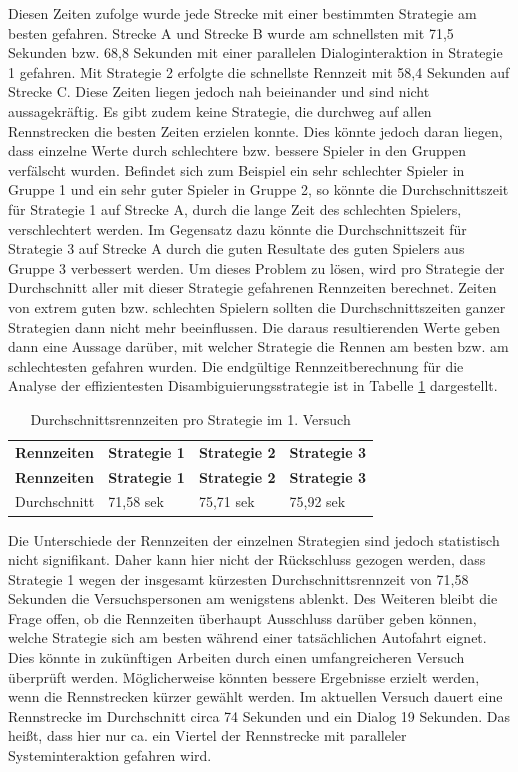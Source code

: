 \documentclass[12pt,a4paper]{scrartcl}
\begin{document}
Diesen Zeiten zufolge wurde jede Strecke mit einer bestimmten Strategie am besten gefahren. Strecke A  und Strecke B wurde am schnellsten mit 71,5 Sekunden bzw. 68,8 Sekunden mit einer parallelen Dialoginteraktion in Strategie 1 gefahren. Mit Strategie 2 erfolgte die schnellste Rennzeit mit 58,4 Sekunden auf Strecke C. Diese Zeiten liegen jedoch nah beieinander und sind nicht aussagekräftig. Es gibt zudem keine Strategie, die durchweg auf allen Rennstrecken die besten Zeiten erzielen konnte. Dies könnte jedoch daran liegen, dass einzelne Werte durch schlechtere bzw. bessere Spieler in den Gruppen verfälscht wurden.
Befindet sich zum Beispiel ein sehr schlechter Spieler in Gruppe 1 und ein sehr guter Spieler in Gruppe 2, so könnte die Durchschnittszeit für Strategie 1 auf Strecke A, durch die lange Zeit des schlechten Spielers, verschlechtert werden. Im Gegensatz dazu könnte die Durchschnittszeit für Strategie 3 auf Strecke A durch die guten Resultate des guten Spielers aus Gruppe 3 verbessert werden. Um dieses Problem zu lösen, wird pro Strategie der Durchschnitt aller mit dieser Strategie gefahrenen Rennzeiten berechnet. Zeiten von extrem guten bzw. schlechten Spielern sollten die Durchschnittszeiten ganzer Strategien dann nicht mehr beeinflussen. Die daraus resultierenden Werte geben dann eine Aussage darüber, mit welcher Strategie die Rennen am besten bzw. am schlechtesten gefahren wurden. 
Die endgültige Rennzeitberechnung für die Analyse der effizientesten Disambiguierungsstrategie ist in Tabelle \ref{RennZeitenDis1} dargestellt.

\begin{longtable}{p{3cm}p{3cm}p{3cm}p{3cm} }
	\label{RennZeitenDis1}\\
	\caption[Durchschnittsrennzeiten pro Strategie im 1. Versuch]{Durchschnittsrennzeiten pro Strategie im 1. Versuch}\\
	\hline
	\textbf{Rennzeiten}&\textbf{Strategie 1}&\textbf{Strategie 2} &\textbf{Strategie 3}\\
	\hline
	\endfirsthead
	\hline
	\textbf{Rennzeiten}&\textbf{Strategie 1}&\textbf{Strategie 2} &\textbf{Strategie 3}\\
	\hline
	\endhead
Durchschnitt & 71,58 sek & 75,71 sek & 75,92 sek\\
\hline
\end{longtable}
Die Unterschiede der Rennzeiten der einzelnen Strategien sind jedoch statistisch nicht signifikant. Daher kann hier nicht der Rückschluss gezogen werden, dass Strategie 1 wegen der insgesamt kürzesten Durchschnittsrennzeit von 71,58 Sekunden die Versuchspersonen am wenigstens ablenkt. Des Weiteren bleibt die Frage offen, ob die Rennzeiten überhaupt Ausschluss darüber geben können, welche Strategie sich am besten während einer tatsächlichen Autofahrt eignet. Dies könnte in zukünftigen Arbeiten durch einen umfangreicheren Versuch überprüft werden. Möglicherweise könnten bessere Ergebnisse erzielt werden, wenn die Rennstrecken kürzer gewählt werden. Im aktuellen Versuch dauert eine Rennstrecke im Durchschnitt circa 74 Sekunden und ein Dialog 19 Sekunden. Das heißt, dass hier nur ca. ein Viertel der Rennstrecke mit paralleler Systeminteraktion gefahren wird.
\end{document}
